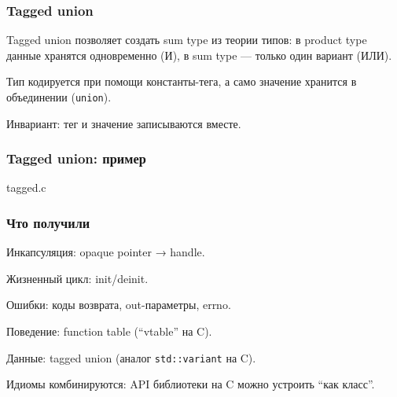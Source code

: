 \documentclass[compress, 8pt, aspectratio=169]{beamer}
\begin{document}
\begin{frame}[fragile]

    \frametitle{Tagged union}

    \begin{myitemize}

        \item Tagged union позволяет создать sum type
            из теории типов: в product type данные
            хранятся одновременно (И), в sum type ---
            только один вариант (ИЛИ).

        \item Тип кодируется при помощи константы-тега,
            а само значение хранится в объединении
            (\texttt{union}).

        \item Инвариант: тег и значение записываются вместе.

    \end{myitemize}

\end{frame}

\begin{frame}[fragile]

    \frametitle{Tagged union: пример}

        {tagged.c}

\end{frame}

\begin{frame}

    \frametitle{Что получили}

    \begin{myitemize}

        \item Инкапсуляция: opaque pointer → handle.

        \item Жизненный цикл: init/deinit.

        \item Ошибки: коды возврата, out-параметры, errno.

        \item Поведение: function table (\enquote{vtable} на C).

        \item Данные: tagged union (аналог \texttt{std::variant} на C).

        \item Идиомы комбинируются: API библиотеки на C можно
            устроить \enquote{как класс}.

    \end{myitemize}

\end{frame}
\end{document}
